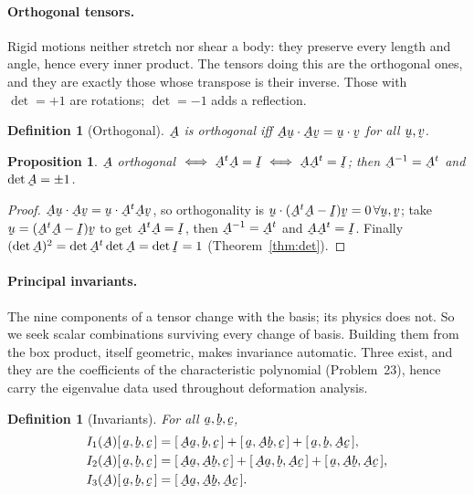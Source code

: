\documentclass[17pt,a4paper]{extreport}
\DeclareRobustCommand{\vek}[1]{\underaccent{\tilde}{#1}}
\newcommand{\I}{\vek{I}}
\newcommand{\ba}{\vek{a}}
\newcommand{\bb}{\vek{b}}
\newcommand{\bc}{\vek{c}}
\newcommand{\bu}{\vek{u}}
\newcommand{\bv}{\vek{v}}
\newcommand{\bA}{\vek{A}}
\newcommand{\tbox}[3]{[\,#1,#2,#3\,]}
\newcommand{\ip}[2]{#1\cdot#2}
\theoremstyle{scplain}
\newtheorem{proposition}[theorem]{Proposition}
\theoremstyle{scdefn}
\newtheorem{definition}[theorem]{Definition}
\theoremstyle{scplain}
\begin{document}
\paragraph*{Orthogonal tensors.}
Rigid motions neither stretch nor shear a body: they preserve every length
and angle, hence every inner product. The tensors doing this are the
orthogonal ones, and they are exactly those whose transpose is their
inverse. Those with $\det=+1$ are rotations; $\det=-1$ adds a reflection.

\begin{definition}[Orthogonal]\label{def:orth}
$\bA$ is orthogonal iff $\ip{\bA\bu}{\bA\bv}=\ip\bu\bv$ for all $\bu,\bv$.
\end{definition}

\begin{proposition}\label{prop:orth}
$\bA$ orthogonal $\iff\bA^{t}\bA=\I\iff\bA\bA^{t}=\I$; then
$\bA^{-1}=\bA^{t}$ and $\det\bA=\pm1$.
\end{proposition}

\begin{proof}
$\ip{\bA\bu}{\bA\bv}=\ip\bu{\bA^{t}\bA\bv}$, so orthogonality is
$\ip\bu{(\bA^{t}\bA-\I)\bv}=0\,\forall\bu,\bv$; take
$\bu=(\bA^{t}\bA-\I)\bv$ to get $\bA^{t}\bA=\I$, then
$\bA^{-1}=\bA^{t}$ and $\bA\bA^{t}=\I$. Finally
$(\det\bA)^{2}=\det\bA^{t}\det\bA=\det\I=1$ (Theorem~\ref{thm:det}).
\end{proof}

\paragraph*{Principal invariants.}
The nine components of a tensor change with the basis; its physics does
not. So we seek scalar combinations surviving every change of basis.
Building them from the box product, itself geometric, makes invariance
automatic. Three exist, and they are the coefficients of the characteristic
polynomial (Problem~23), hence carry the eigenvalue data used throughout
deformation analysis.

\begin{definition}[Invariants]\label{def:inv3}
For all $\ba,\bb,\bc$,
\[
\begin{aligned}
I_{1}(\bA)\tbox\ba\bb\bc&=\tbox{\bA\ba}\bb\bc+\tbox\ba{\bA\bb}\bc+\tbox\ba\bb{\bA\bc},\\
I_{2}(\bA)\tbox\ba\bb\bc&=\tbox{\bA\ba}{\bA\bb}\bc+\tbox{\bA\ba}\bb{\bA\bc}+\tbox\ba{\bA\bb}{\bA\bc},\\
I_{3}(\bA)\tbox\ba\bb\bc&=\tbox{\bA\ba}{\bA\bb}{\bA\bc}.
\end{aligned}
\]
\end{definition}
\end{document}
